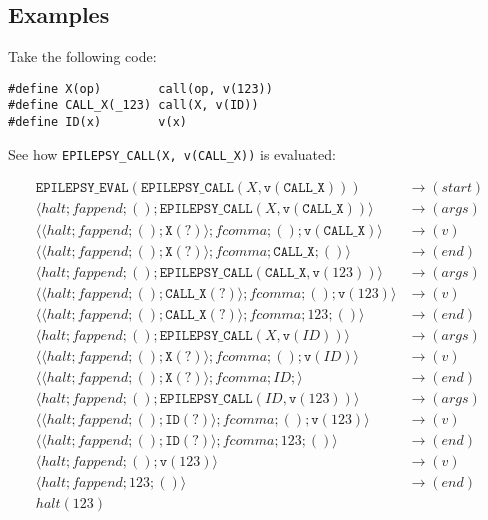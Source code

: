 \documentclass[12pt]{article}
\theoremstyle{break}
\begin{document}
\subsection{Examples}

Take the following code:

\begin{verbatim}
#define X(op)        call(op, v(123))
#define CALL_X(_123) call(X, v(ID))
#define ID(x)        v(x)
\end{verbatim}

See how \texttt{EPILEPSY\_CALL(X, v(CALL\_X))} is evaluated:

\begin{example}
\begin{align*}
    \texttt{EPILEPSY\_EVAL}(\texttt{EPILEPSY\_CALL}(X, \texttt{v}(\texttt{CALL\_X}))) & \to (start) \\
    \langle halt; fappend; (); \texttt{EPILEPSY\_CALL}(X, \texttt{v}(\texttt{CALL\_X})) \rangle & \to (args) \\
    \langle \langle halt; fappend; (); \texttt{X}(?) \rangle; fcomma; (); \texttt{v}(\texttt{CALL\_X}) \rangle & \to (v) \\
    \langle \langle halt; fappend; (); \texttt{X}(?) \rangle; fcomma; \texttt{CALL\_X}; () \rangle & \to (end) \\
    \langle halt; fappend; (); \texttt{EPILEPSY\_CALL}(\texttt{CALL\_X}, \texttt{v}(123)) \rangle & \to (args) \\
    \langle \langle halt; fappend; (); \texttt{CALL\_X}(?) \rangle; fcomma; (); \texttt{v}(123) \rangle & \to (v) \\
    \langle \langle halt; fappend; (); \texttt{CALL\_X}(?) \rangle; fcomma; 123; () \rangle & \to (end) \\
    \langle halt; fappend; (); \texttt{EPILEPSY\_CALL}(X, \texttt{v}(ID)) \rangle & \to (args) \\
    \langle \langle halt; fappend; (); \texttt{X}(?) \rangle; fcomma; (); \texttt{v}(ID) \rangle & \to (v) \\
    \langle \langle halt; fappend; (); \texttt{X}(?) \rangle; fcomma; ID; \rangle & \to (end) \\
    \langle halt; fappend; (); \texttt{EPILEPSY\_CALL}(ID, \texttt{v}(123)) \rangle & \to (args) \\
    \langle \langle halt; fappend; (); \texttt{ID}(?) \rangle; fcomma; (); \texttt{v}(123) \rangle & \to (v) \\
    \langle \langle halt; fappend; (); \texttt{ID}(?) \rangle; fcomma; 123; () \rangle & \to (end) \\
    \langle halt; fappend; (); \texttt{v}(123) \rangle & \to (v) \\
    \langle halt; fappend; 123; () \rangle & \to (end) \\
    halt(123) &
\end{align*}
\end{example}
\end{document}
